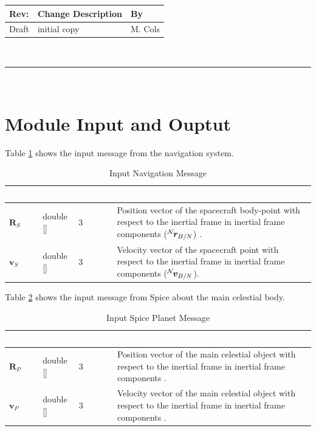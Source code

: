 \documentclass[]{AVSSimReportMemo}
\begin{document}
\makeCover


%
%
\pagestyle{empty}
{\renewcommand{\arraystretch}{2}
\noindent
\begin{longtable}{|p{0.5in}|p{4.5in}|p{1.14in}|}
\hline
{\bfseries Rev}: & {\bfseries Change Description} & {\bfseries By} \\
\hline
Draft & initial copy & M. Cols \\
\hline

\end{longtable}
}

\newpage
\setcounter{page}{1}
\pagestyle{fancy}

\tableofcontents
~\\ \hrule ~\\

\section{Module Input and Ouptut}

Table \ref{tab:inputNavTable} shows the input message from the navigation system.
\begin{table}[h!]
	\centering
	\caption{Input Navigation Message}
	\begin{tabular}{|l|l|l|p{3in}|}
		\hline
		\rowcolor{BrickRed}
		\textcolor{white}{Name} & \textcolor{white}{Type} & 
		\textcolor{white}{Length} & 
		\textcolor{white}{Description}  \\ \hline
		$\bm{R}_S$ & double [] & 3 & 
		Position vector of the spacecraft body-point with respect to the inertial frame in inertial frame components 
		($\leftexp{N}{\bm{r}}_{B/N}$) . \\ \hline
		$\bm{v}_S$ & double [] & 3 & 
		Velocity vector of the spacecraft point with respect to the inertial frame in inertial frame components 
		($\leftexp{N}{\bm{v}}_{B/N}$). \\ \hline
	\end{tabular}
	\label{tab:inputNavTable}
\end{table}


Table \ref{tab:inputCelTable} shows the input message from Spice about the main celestial body.
\begin{table}[h!]
	\centering
	\caption{Input Spice Planet Message}
	\begin{tabular}{|l|l|l|p{3in}|}
		\hline
		\rowcolor{BrickRed}
		\textcolor{white}{Name} & \textcolor{white}{Type} & 
		\textcolor{white}{Length} & 
		\textcolor{white}{Description}  \\ \hline
		$\bm{R}_P$  & double [] & 3 & 
		Position vector of the main celestial object with respect to the inertial frame in inertial frame components . \\ \hline
		$\bm{v}_P$  & double [] & 3 & 
		Velocity vector of the main celestial object with respect to the inertial frame in inertial frame components . \\ \hline
	\end{tabular}
	\label{tab:inputCelTable}
\end{table}
\end{document}

